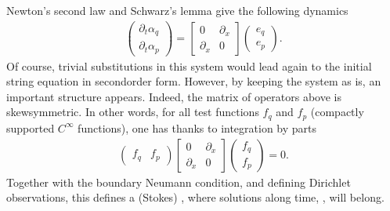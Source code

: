 \documentclass[letterpaper,10pt,english]{sphinxmanual}
\begin{document}
\sphinxAtStartPar
Newton’s second law and Schwarz’s lemma give the following dynamics
\begin{equation*}
\begin{split}\begin{pmatrix} \partial_t \alpha_q \\ \partial_t \alpha_p \end{pmatrix}
=
\begin{bmatrix} 0 & \partial_x \\ \partial_x & 0 \end{bmatrix}
\begin{pmatrix} e_q \\ e_p \end{pmatrix}.\end{split}
\end{equation*}
\sphinxAtStartPar
Of course, trivial substitutions in this system would lead again to the
initial string equation in second\sphinxhyphen{}order form. However, by keeping the
system as is, an important structure appears. Indeed, the matrix of
operators above is  skew\sphinxhyphen{}symmetric. In other words, for all
test functions \(f_q\) and \(f_p\) (compactly supported
\(C^\infty\) functions), one has thanks to integration by parts
\begin{equation*}
\begin{split}\begin{pmatrix} f_q & f_p \end{pmatrix}
\begin{bmatrix} 0 & \partial_x \\ \partial_x & 0 \end{bmatrix}
\begin{pmatrix} f_q \\ f_p \end{pmatrix} = 0.\end{split}
\end{equation*}
\sphinxAtStartPar
Together with the boundary Neumann condition, and defining 
Dirichlet observations, this defines a (Stokes\sphinxhyphen{}) ,
where solutions along time,  , will belong.
\end{document}

